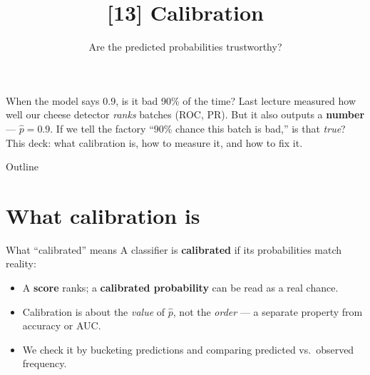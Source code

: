 \documentclass[aspectratio=169]{beamer}
\title{[13] Calibration}
\subtitle{Are the predicted probabilities trustworthy?}
\date{}
\begin{document}
\begin{frame}{When the model says 0.9, is it bad 90\% of the time?}
  Last lecture measured how well our cheese detector \emph{ranks} batches (ROC, PR). But it
  also outputs a \textbf{number} --- $\hat p = 0.9$. If we tell the factory ``$90\%$ chance
  this batch is bad,'' is that \emph{true}?
  \vfill
  \vfill
  This deck: what calibration is, how to measure it, and how to fix it.
\end{frame}

\begin{frame}{Outline}
  \tableofcontents
\end{frame}

\section{What calibration is}

\begin{frame}{What ``calibrated'' means}
  A classifier is \textbf{calibrated} if its probabilities match reality:
  \vfill
  \vfill
  \begin{itemize}
    \item A \textbf{score} ranks; a \textbf{calibrated probability} can be read as a real chance.
    \item Calibration is about the \emph{value} of $\hat p$, not the \emph{order} --- a separate
      property from accuracy or AUC.
    \item We check it by bucketing predictions and comparing predicted vs.\ observed frequency.
  \end{itemize}
\end{frame}
\end{document}
